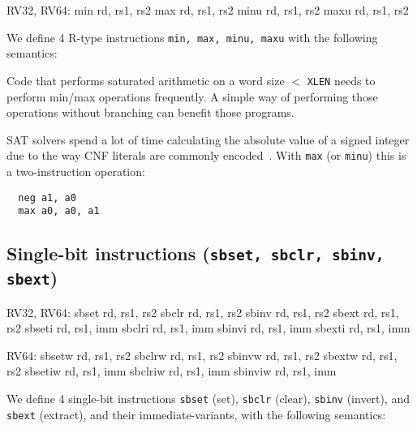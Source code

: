 \begin{rvb}
  RV32, RV64:
    min  rd, rs1, rs2
    max  rd, rs1, rs2
    minu rd, rs1, rs2
    maxu rd, rs1, rs2
\end{rvb}

We define 4 R-type instructions \texttt{min, max, minu, maxu} with the
following semantics:



Code that performs saturated arithmetic on a word size $<$ \texttt{XLEN} needs to perform
min/max operations frequently. A simple way of performing those operations without branching
can benefit those programs.

SAT solvers spend a lot of time calculating the absolute value of a signed
integer due to the way CNF literals are commonly encoded~\cite{BiereComm}. With
\texttt{max} (or \texttt{minu}) this is a two-instruction operation:

\begin{minipage}{\linewidth}
\begin{verbatim}
  neg a1, a0
  max a0, a0, a1
\end{verbatim}
\end{minipage}


\subsection{Single-bit instructions (\texttt{sbset, sbclr, sbinv, sbext})}

\begin{rvb}
  RV32, RV64:
    sbset  rd, rs1, rs2
    sbclr  rd, rs1, rs2
    sbinv  rd, rs1, rs2
    sbext  rd, rs1, rs2
    sbseti rd, rs1, imm
    sbclri rd, rs1, imm
    sbinvi rd, rs1, imm
    sbexti rd, rs1, imm

  RV64:
    sbsetw  rd, rs1, rs2
    sbclrw  rd, rs1, rs2
    sbinvw  rd, rs1, rs2
    sbextw  rd, rs1, rs2
    sbsetiw rd, rs1, imm
    sbclriw rd, rs1, imm
    sbinviw rd, rs1, imm
\end{rvb}

We define 4 single-bit instructions \texttt{sbset} (set), \texttt{sbclr} (clear),
\texttt{sbinv} (invert), and \texttt{sbext} (extract), and their immediate-variants,
with the following semantics:




